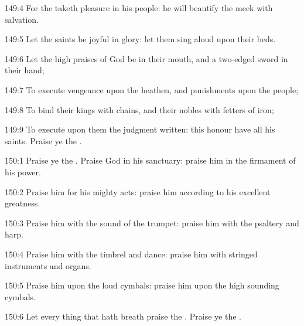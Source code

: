 149:4 For the \LORD taketh pleasure in his people: he will beautify the
meek with salvation.

149:5 Let the saints be joyful in glory: let them sing aloud upon
their beds.

149:6 Let the high praises of God be in their mouth, and a two-edged
sword in their hand;

149:7 To execute vengeance upon the heathen, and punishments upon the
people;

149:8 To bind their kings with chains, and their nobles with fetters
of iron;

149:9 To execute upon them the judgment written: this honour have all
his saints. Praise ye the \LORD.



150:1 Praise ye the \LORD. Praise God in his sanctuary: praise him in
the firmament of his power.

150:2 Praise him for his mighty acts: praise him according to his
excellent greatness.

150:3 Praise him with the sound of the trumpet: praise him with the
psaltery and harp.

150:4 Praise him with the timbrel and dance: praise him with stringed
instruments and organs.

150:5 Praise him upon the loud cymbals: praise him upon the high
sounding cymbals.

150:6 Let every thing that hath breath praise the \LORD. Praise ye the \LORD.

